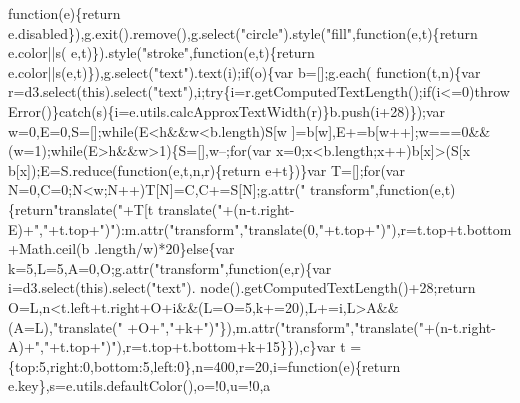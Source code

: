\begin{DoxyCode}
{{{      function}(e)\{\textcolor{keywordflow}{return} e.disabled\}),g.exit().remove(),g.select(\textcolor{stringliteral}{"circle"}).style(\textcolor{stringliteral}{"fill"},\textcolor{keyword}{function}(e,t)\{\textcolor{keywordflow}{return} e.color||s(
      e,t)\}).style(\textcolor{stringliteral}{"stroke"},\textcolor{keyword}{function}(e,t)\{\textcolor{keywordflow}{return} e.color||s(e,t)\}),g.select(\textcolor{stringliteral}{"text"}).text(i);\textcolor{keywordflow}{if}(o)\{var b=[];g.each(\textcolor{keyword}{
      function}(t,n)\{var r=d3.select(\textcolor{keyword}{this}).select(\textcolor{stringliteral}{"text"}),i;\textcolor{keywordflow}{try}\{i=r.getComputedTextLength();\textcolor{keywordflow}{if}(i<=0)\textcolor{keywordflow}{throw} 
      Error()\}\textcolor{keywordflow}{catch}(s)\{i=e.utils.calcApproxTextWidth(r)\}b.push(i+28)\});var w=0,E=0,S=[];\textcolor{keywordflow}{while}(E<h&&w<b.length)S[w
      ]=b[w],E+=b[w++];w===0&&(w=1);\textcolor{keywordflow}{while}(E>h&&w>1)\{S=[],w--;\textcolor{keywordflow}{for}(var x=0;x<b.length;x++)b[x]>(S[x%
      b[x]);E=S.reduce(\textcolor{keyword}{function}(e,t,n,r)\{\textcolor{keywordflow}{return} e+t\})\}var T=[];\textcolor{keywordflow}{for}(var N=0,C=0;N<w;N++)T[N]=C,C+=S[N];g.attr(\textcolor{stringliteral}{"
      transform"},\textcolor{keyword}{function}(e,t)\{\textcolor{keywordflow}{return}\textcolor{stringliteral}{"translate("}+T[t%
      translate("}+(n-t.right-E)+\textcolor{stringliteral}{","}+t.top+\textcolor{stringliteral}{")"}):m.attr(\textcolor{stringliteral}{"transform"},\textcolor{stringliteral}{"translate(0,"}+t.top+\textcolor{stringliteral}{")"}),r=t.top+t.bottom+Math.ceil(b
      .length/w)*20\}\textcolor{keywordflow}{else}\{var k=5,L=5,A=0,O;g.attr(\textcolor{stringliteral}{"transform"},\textcolor{keyword}{function}(e,r)\{var i=d3.select(\textcolor{keyword}{this}).select(\textcolor{stringliteral}{"text"}).
      node().getComputedTextLength()+28;\textcolor{keywordflow}{return} O=L,n<t.left+t.right+O+i&&(L=O=5,k+=20),L+=i,L>A&&(A=L),\textcolor{stringliteral}{"translate("}
      +O+\textcolor{stringliteral}{","}+k+\textcolor{stringliteral}{")"}\}),m.attr(\textcolor{stringliteral}{"transform"},\textcolor{stringliteral}{"translate("}+(n-t.right-A)+\textcolor{stringliteral}{","}+t.top+\textcolor{stringliteral}{")"}),r=t.top+t.bottom+k+15\}\}),c\}var t
      =\{top:5,right:0,bottom:5,left:0\},n=400,r=20,i=\textcolor{keyword}{function}(e)\{\textcolor{keywordflow}{return} e.key\},s=e.utils.defaultColor(),o=!0,u=!0,a
}
\end{DoxyCode}
